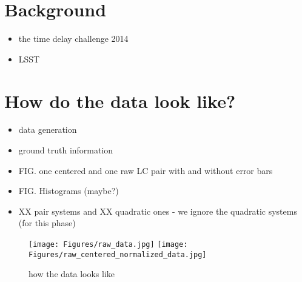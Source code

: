 \documentclass[a4paper, 11pt]{article}
\begin{document}
\section{Background}
  \begin{itemize}
    \item the time delay challenge 2014
    \item LSST
  \end{itemize}

\section{How do the data look like?}
  \begin{itemize}
    \item data generation
    \item ground truth information
    \item FIG. one centered and one raw LC pair with and without error bars
    \item FIG. Histograms (maybe?)
    \item XX pair systems and XX quadratic ones - we ignore the quadratic systems (for this phase)
  \end{itemize}
\begin{figure}
\centering
\texttt{[image: Figures/raw\_data.jpg]}
\texttt{[image: Figures/raw\_centered\_normalized\_data.jpg]}
\caption{how the data looks like}
\label{fig:raw_data}
\end{figure}
\end{document}
